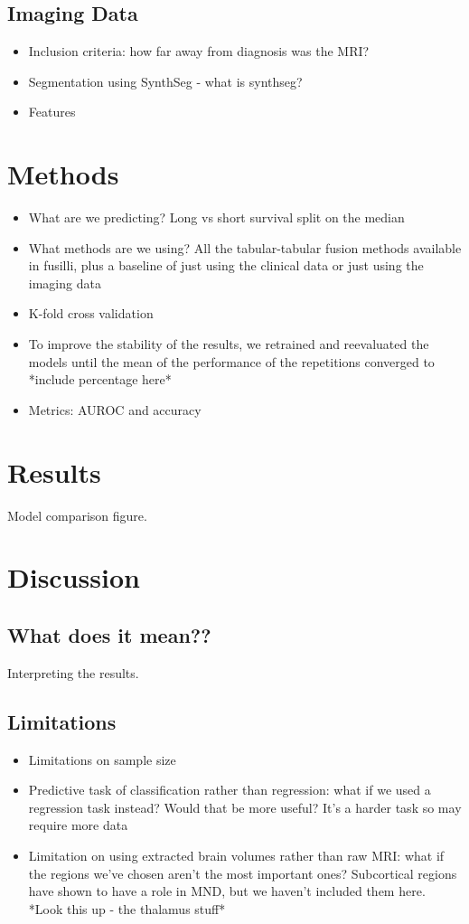 \subsection{Imaging Data}
\begin{itemize}
    \item Inclusion criteria: how far away from diagnosis was the MRI?
    \item Segmentation using SynthSeg - what is synthseg?
    \item Features
\end{itemize}

\section{Methods}
\begin{itemize}
    \item What are we predicting? Long vs short survival split on the median
    \item What methods are we using? All the tabular-tabular fusion methods available in fusilli, plus a baseline of just using the clinical data or just using the imaging data
    \item K-fold cross validation
    \item To improve the stability of the results, we retrained and reevaluated the models until the mean of the performance of the repetitions converged to *include percentage here*
    \item Metrics: AUROC and accuracy
\end{itemize}

\section{Results}
Model comparison figure.

\section{Discussion}
\subsection{What does it mean??}
Interpreting the results.

\subsection{Limitations}
\begin{itemize}
    \item Limitations on sample size
    \item Predictive task of classification rather than regression: what if we used a regression task instead? Would that be more useful? It's a harder task so may require more data
    \item Limitation on using extracted brain volumes rather than raw MRI: what if the regions we've chosen aren't the most important ones? Subcortical regions have shown to have a role in MND, but we haven't included them here. *Look this up - the thalamus stuff*
\end{itemize}

